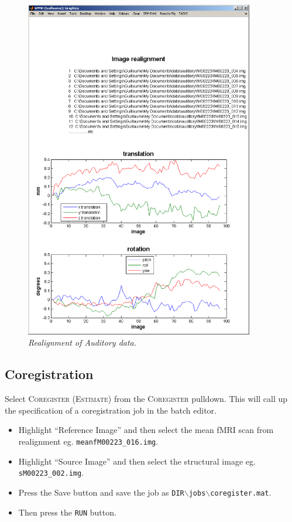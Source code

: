 \begin{figure}
\begin{center}
\includegraphics[width=100mm]{auditory/realign}
\caption{\em Realignment of Auditory data.\label{aud_realign}}
\end{center}
\end{figure}

\subsection{Coregistration}

Select \textsc{Coregister (Estimate)} from the \textsc{Coregister} pulldown. This will call up the specification of a coregistration job in the batch editor. 

\begin{itemize}
\item Highlight ``Reference Image'' and then select the mean fMRI scan from realignment eg. \texttt{meanfM00223\_016.img}.
\item Highlight ``Source Image'' and then select the structural image eg. \texttt{sM00223\_002.img}.
\item Press the Save button and save the job as \texttt{DIR$\backslash$jobs$\backslash$coregister.mat}.
\item Then press the \texttt{RUN} button.
\end{itemize}

